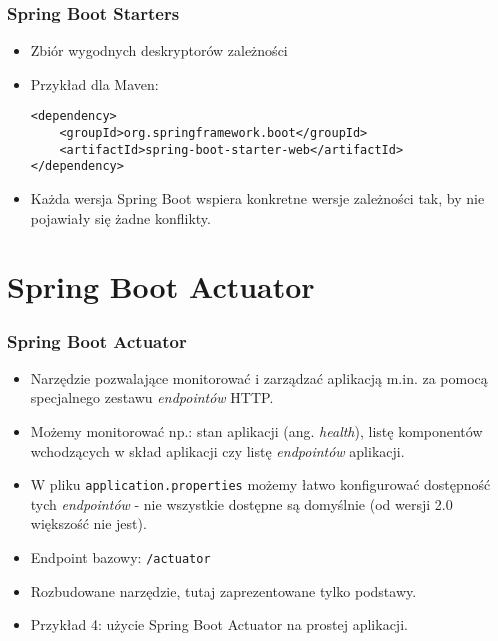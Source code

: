 \documentclass{beamer}
\begin{document}
\begin{frame}[fragile]
\frametitle{Spring Boot Starters}
\begin{itemize}
\item Zbiór wygodnych deskryptorów zależności
\item Przykład dla Maven:
\begin{lstlisting}
<dependency>
    <groupId>org.springframework.boot</groupId>
    <artifactId>spring-boot-starter-web</artifactId>
</dependency>
\end{lstlisting}
\item Każda wersja Spring Boot wspiera konkretne wersje zależności tak, by nie pojawiały się żadne konflikty.
\end{itemize}
\end{frame}


\section{Spring Boot Actuator}

\begin{frame}
\frametitle{Spring Boot Actuator}
\begin{itemize}
\item Narzędzie pozwalające monitorować i zarządzać aplikacją m.in. za pomocą specjalnego zestawu \textit{endpointów} HTTP.
\item Możemy monitorować np.: stan aplikacji (ang. \textit{health}), listę komponentów wchodzących w skład aplikacji czy listę \textit{endpointów} aplikacji.
\item W pliku \lstinline{application.properties} możemy łatwo konfigurować dostępność tych \textit{endpointów} - nie wszystkie dostępne są domyślnie (od wersji 2.0 większość nie jest).
\item Endpoint bazowy: \lstinline{/actuator}
\item Rozbudowane narzędzie, tutaj zaprezentowane tylko podstawy.
\item Przykład 4: użycie Spring Boot Actuator na prostej aplikacji.
\end{itemize}
\end{frame}
\end{document}
